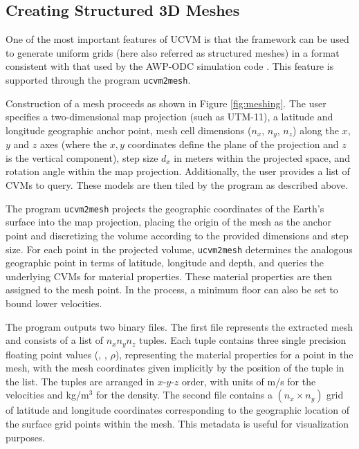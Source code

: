 


\subsection{Creating Structured 3D Meshes}

One of the most important features of UCVM is that the framework can be used to generate uniform grids (here also referred as structured meshes) in a format consistent with that used by the AWP-ODC simulation code \citep{Cui_2010_Proc}. This feature is supported through the program \texttt{ucvm2mesh}.

Construction of a mesh proceeds as shown in Figure \ref{fig:meshing}. The user specifies a two-dimensional map projection (such as UTM-11), a latitude and longitude geographic anchor point, mesh cell dimensions ($n_x$, $n_y$, $n_z$) along the $x$, $y$ and $z$ axes (where the $x,y$ coordinates define the plane of the projection and $z$ is the vertical component), step size $d_x$ in meters within the projected space, and rotation angle within the map projection. Additionally, the user provides a list of CVMs to query. These models are then tiled by the program as described above.

The program \texttt{ucvm2mesh} projects the geographic coordinates of the Earth's surface into the map projection, placing the origin of the mesh as the anchor point and discretizing the volume according to the provided dimensions and step size. For each point in the projected volume, \texttt{ucvm2mesh} determines the analogous geographic point in terms of latitude, longitude and depth, and queries the underlying CVMs for material properties. These material properties are then assigned to the mesh point. In the process, a minimum \vs{} floor can also be set to bound lower velocities.

The program outputs two binary files. The first file represents the extracted mesh and consists of a list of $n_xn_yn_z$ tuples. Each tuple contains three single precision floating point values (\vp{}, \vs{}, $\rho$), representing the material properties for a point in the mesh, with the mesh coordinates given implicitly by the position of the tuple in the list. The tuples are arranged in $x$-$y$-$z$ order, with units of m/s for the velocities and kg/m$^3$ for the density. The second file contains a $(n_x \times n_y)$ grid of latitude and longitude coordinates corresponding to the geographic location of the surface grid points within the mesh. This metadata is useful for visualization purposes.

